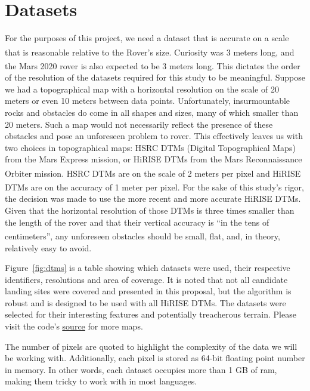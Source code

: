 \documentclass[12pt]{article}
\newcommand{\supcite}[1]{\textsuperscript{\cite{#1}}}
\begin{document}
\section{Datasets}
\label{sec:datasets}
\par For the purposes of this project, we need a dataset that is accurate on a scale that is reasonable relative to the Rover's size. Curiosity was 3 meters long\supcite{bib:curiosity}, and the Mars 2020 rover is also expected to be 3 meters long\supcite{bib:rover2020}. This dictates the order of the resolution of the datasets required for this study to be meaningful. Suppose we had a topographical map with a horizontal resolution on the scale of 20 meters or even 10 meters between data points. Unfortunately, insurmountable rocks and obstacles do come in all shapes and sizes, many of which smaller than 20 meters. Such a map would not necessarily reflect the presence of these obstacles and pose an unforeseen problem to rover. This effectively leaves us with two choices in topographical maps: HSRC DTMs (Digital Topographical Maps) from the Mars Express mission, or HiRISE DTMs from the Mars Reconnaissance Orbiter mission. HSRC DTMs are on the scale of 2 meters per pixel\supcite{bib:hsrc} and HiRISE DTMs are on the accuracy of 1 meter per pixel\supcite{bib:abouthirise}. For the sake of this study's rigor, the decision was made to use the more recent and more accurate HiRISE DTMs. Given that the horizontal resolution of those DTMs is three times smaller than the length of the rover and that their vertical accuracy is ``in the tens of centimeters''\supcite{bib:abouthirise}, any unforeseen obstacles should be small, flat, and, in theory, relatively easy to avoid.
\par Figure~\ref{fig:dtms} is a table showing which datasets were used, their respective identifiers, resolutions and area of coverage. It is noted that not all candidate landing sites were covered and presented in this proposal, but the algorithm is robust and is designed to be used with all HiRISE DTMs. The datasets were selected for their interesting features and potentially treacherous terrain. Please visit the code's \href{https://github.com/PapaCharlie/Rover-Climb-Angles/tree/master/figures/maps/}{\ttfamily\color{blue} \underline{source}} for more maps.
\par The number of pixels are quoted to highlight the complexity of the data we will be working with. Additionally, each pixel is stored as 64-bit floating point number in memory. In other words, each dataset occupies more than 1 GB of ram, making them tricky to work with in most languages.
\end{document}
